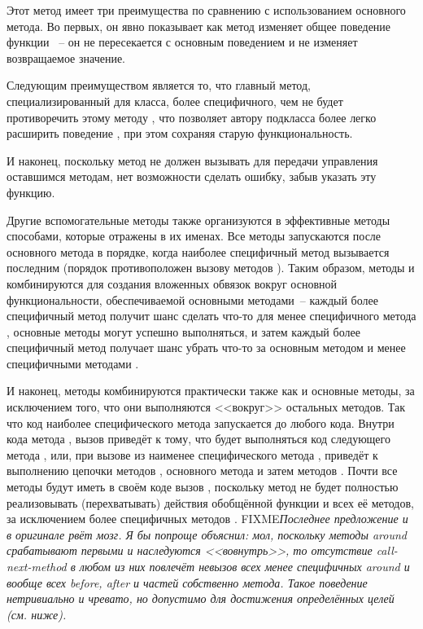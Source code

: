 Этот метод  имеет три преимущества по сравнению с использованием основного
метода.  Во первых, он явно показывает как метод изменяет общее поведение функции
~-- он не пересекается с основным поведением и не изменяет возвращаемое
значение.

Следующим преимуществом является то, что главный метод, специализированный для класса,
более специфичного, чем  не будет противоречить этому методу
, что позволяет автору подкласса  более легко
расширить поведение , при этом сохраняя старую функциональность.

И наконец, поскольку метод  не должен вызывать  для
передачи управления оставшимся методам, нет возможности сделать ошибку, забыв указать эту
функцию.

Другие вспомогательные методы также организуются в эффективные методы способами, которые
отражены в их именах.  Все методы  запускаются после основного метода в
порядке, когда наиболее специфичный метод вызывается последним (порядок противоположен
вызову методов ).  Таким образом, методы  и 
комбинируются для создания вложенных обвязок вокруг основной функциональности,
обеспечиваемой основными методами~-- каждый более специфичный метод  получит
шанс сделать что-то для менее специфичного метода , основные методы могут
успешно выполняться, и затем каждый более специфичный метод  получает шанс
убрать что-то за основным методом и менее специфичными методами .

И наконец, методы  комбинируются практически также как и основные методы, за
исключением того, что они выполняются <<вокруг>> остальных методов. Так что код наиболее
специфического метода  запускается до любого кода. Внутри кода метода
, вызов  приведёт к тому, что будет выполняться код
следующего метода , или, при вызове из наименее специфического метода
, приведёт к выполнению цепочки методов , основного метода и
затем методов .  Почти все методы  будут иметь в своём коде
вызов , поскольку метод  не будет полностью
реализовывать (перехватывать) действия обобщённой функции и всех её методов, за
исключением более специфичных методов . FIXME\textit{Последнее предложение и
  в оригинале рвёт мозг. Я бы попроще объяснил: мол, поскольку методы around срабатывают
  первыми и наследуются <<вовнутрь>>, то отсутствие call-next-method в любом из них повлечёт
  невызов всех менее специфичных around и вообще всех before, after и частей собственно
  метода. Такое поведение нетривиально и чревато, но допустимо для достижения определённых
  целей (см. ниже).}

